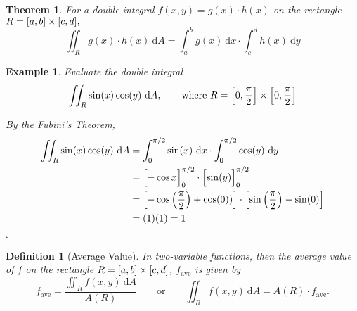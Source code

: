 \documentclass[12pt,a4paper]{article}
\newtheorem{thm}{Theorem}[subsection]
\newtheorem{df}{Definition}[subsection]
\newtheorem{eg}{Example}[subsection]
\newenvironment*{ans}{\par\indent{\textit{Answer. }}\par}{\par\hfill{$\square$}\par}
\def\d{{\mathrm{d}}}
\def\dx{\d x}
\def\iintR{\displaystyle\iint_R}
\begin{document}
\begin{thm}
	For a double integral $f(x,y)=g(x)\cdot h(x)$ on the rectangle $R=\qty[a,b]\times\qty[c,d],$ \[\iint_R g(x)\cdot h(x)\ \d A=\int_a^b g(x)\ \dx\cdot\int_c^d h(x)\ \d y\]
\end{thm}
\begin{eg}
	Evaluate the double integral \[\iintR\sin(x)\cos(y)\ \d A,\qquad\text{where }R=\qty[0,\dfrac{\pi}{2}]\times\qty[0,\dfrac{\pi}{2}]\]	
	\begin{ans}
		By the Fubini's Theorem, \[\begin{aligned}\iintR\sin(x)\cos(y)\ \d A&=\int_0^{\pi/2}\sin(x)\ \dx\cdot\int_0^{\pi/2}\cos(y)\ \d y\\&=\qty\Big[-\cos{x}]_0^{\pi/2}\cdot\qty\Big[\sin(y)]_0^{\pi/2}\\&=\qty[-\cos\qty(\dfrac{\pi}{2})+\cos(0))]\cdot\qty[\sin\qty(\dfrac{\pi}{2})-\sin(0)]\\&=(1)(1)=1\end{aligned}\]
	\end{ans}
\end{eg}
\begin{df}[Average Value]
	In two-variable functions, then the average value of $f$ on the rectangle $R=\qty[a,b]\times[c,d]$, $f_\text{ave}$ is given by \[f_\text{ave}=\dfrac{\iintR f(x,y)\ \d A}{A(R)}\qquad\text{or}\qquad\iintR f(x,y)\ \d A=A(R)\cdot f_\text{ave}.\]	
\end{df}
\end{document}
